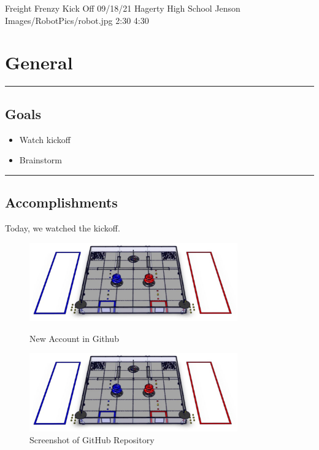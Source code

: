 \insertmeeting 
	{Freight Frenzy Kick Off} 
	{09/18/21}
	{Hagerty High School}
	{Jenson}
	{Images/RobotPics/robot.jpg}
	{2:30}
  {4:30}
	
\section*{General}
\noindent\hfil\rule{\textwidth}{.4pt}\hfil
\subsection*{Goals}
\begin{itemize}
    \item Watch kickoff
    \item Brainstorm   

\end{itemize} 

\noindent\hfil\rule{\textwidth}{.4pt}\hfil

\subsection*{Accomplishments}
Today, we watched the kickoff.
 

\begin{figure}[ht]
\centering
\begin{minipage}[b]{.50\textwidth}
  \centering
  \includegraphics[width=0.8\textwidth]{Meetings/September/09-18-21/field.png}
  \caption{New Account in Github}
  \label{fig:pic1}
\end{minipage}%
\hfill%
\begin{minipage}[b]{.50\textwidth}
  \centering
  \includegraphics[width=0.8\textwidth]{Meetings/September/09-18-21/field.png}
  \caption{Screenshot of GitHub Repository}
  \label{fig:pic2}
\end{minipage}
\end{figure}







